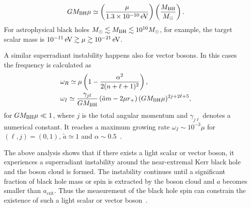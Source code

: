 \documentclass[%
 preprint,
 nofootinbib,
 amsmath,amssymb,
 aps,
 a4paper
]{revtex4-1}
\begin{document}
\begin{align}
	GM_{\rm BH} \mu \simeq \left(\frac{\mu}{1.3\times 10^{-10}\,{\rm eV}}\right)\left(\frac{M_{\rm BH}}{M_\odot}\right).
\end{align}
For astrophysical black holes $M_{\odot}\lesssim M_{\rm BH} \lesssim 10^{10}M_\odot$, for example, the target scalar mass is $10^{-11}\,{\rm eV} \gtrsim \mu \gtrsim 10^{-21}\,{\rm eV}$.

A similar superradiant instability happens also for vector bosons. In this cases the frequency is calculated as~\cite{Rosa:2011my,Pani:2012vp,Pani:2012bp,Brito:2015oca,Baryakhtar:2017ngi}
\begin{align}
	&\omega_R \simeq \mu\left(1-\frac{\alpha^2}{2(n+\ell+1)^2}\right),\\
	&\omega_I \simeq \frac{\gamma_{j\ell}}{GM_{\rm BH}} \left( \tilde a m-2\mu r_+ \right)(GM_{\rm BH} \mu)^{2 j + 2\ell+5},
	\label{omegaI_vec}
\end{align}
for $GM_{\rm BH} \mu\ll 1$, where $j$ is the total angular momentum and  $\gamma_{j\ell}$ denotes a numerical constant. 
It reaches a maximum growing rate $\omega_I \sim 10^{-3} \mu$ for $(\ell,j)=(0,1)$, $\tilde a\simeq 1$ and $\alpha \sim 0.5$~\cite{Baryakhtar:2017ngi,Dolan:2018dqv}.


The above analysis shows that if there exists a light scalar or vector boson, it experiences a superradiant instability around the near-extremal Kerr black hole and the boson cloud is formed. The instability continues until a significant fraction of black hole mass or spin is extracted by the boson cloud and $a$ becomes smaller than $a_\text{crit}$.
Thus the measurement of the black hole spin can constrain the existence of such a light scalar or vector boson~\cite{Brito:2014wla,Brito:2015oca}.
\end{document}
